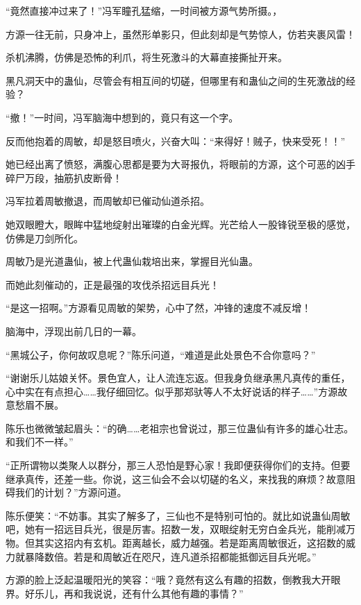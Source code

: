 
\begin{this_body}

“竟然直接冲过来了！”冯军瞳孔猛缩，一时间被方源气势所摄。，

方源一往无前，只身冲上，虽然形单影只，但此刻却是气势惊人，仿若夹裹风雷！

杀机沸腾，仿佛是恐怖的利爪，将生死激斗的大幕直接撕扯开来。

黑凡洞天中的蛊仙，尽管会有相互间的切磋，但哪里有和蛊仙之间的生死激战的经验？

“撤！”一时间，冯军脑海中想到的，竟只有这一个字。

反而他抱着的周敏，却是怒目喷火，兴奋大叫：“来得好！贼子，快来受死！！”

她已经出离了愤怒，满腹心思都是要为大哥报仇，将眼前的方源，这个可恶的凶手碎尸万段，抽筋扒皮断骨！

冯军拉着周敏撤退，而周敏却已催动仙道杀招。

她双眼瞪大，眼眸中猛地绽射出璀璨的白金光辉。光芒给人一股锋锐至极的感觉，仿佛是刀剑所化。

周敏乃是光道蛊仙，被上代蛊仙栽培出来，掌握目光仙蛊。

而她此刻催动的，正是最强的攻伐杀招远目兵光！

“是这一招啊。”方源看见周敏的架势，心中了然，冲锋的速度不减反增！

脑海中，浮现出前几日的一幕。

“黑城公子，你何故叹息呢？”陈乐问道，“难道是此处景色不合你意吗？”

“谢谢乐儿姑娘关怀。景色宜人，让人流连忘返。但我身负继承黑凡真传的重任，心中实在有点担心……我仔细回忆。似乎那郑驮等人不太好说话的样子……”方源故意愁眉不展。

陈乐也微微皱起眉头：“的确……老祖宗也曾说过，那三位蛊仙有许多的雄心壮志。和我们不一样。”

“正所谓物以类聚人以群分，那三人恐怕是野心家！我即便获得你们的支持。但要继承真传，还差一些。你说，这三仙会不会以切磋的名义，来找我的麻烦？故意阻碍我们的计划？”方源问道。

陈乐便笑：“不妨事。其实了解多了，三仙也不是特别可怕的。就比如说蛊仙周敏吧，她有一招远目兵光，很是厉害。招数一发，双眼绽射无穷白金兵光，能削减万物。但其实这招内有玄机。距离越长，威力越强。若是距离周敏很近，这招数的威力就暴降数倍。若是和周敏近在咫尺，连凡道杀招都能抵御远目兵光呢。”

方源的脸上泛起温暖阳光的笑容：“哦？竟然有这么有趣的招数，倒教我大开眼界。好乐儿，再和我说说，还有什么其他有趣的事情？”


\end{this_body}
